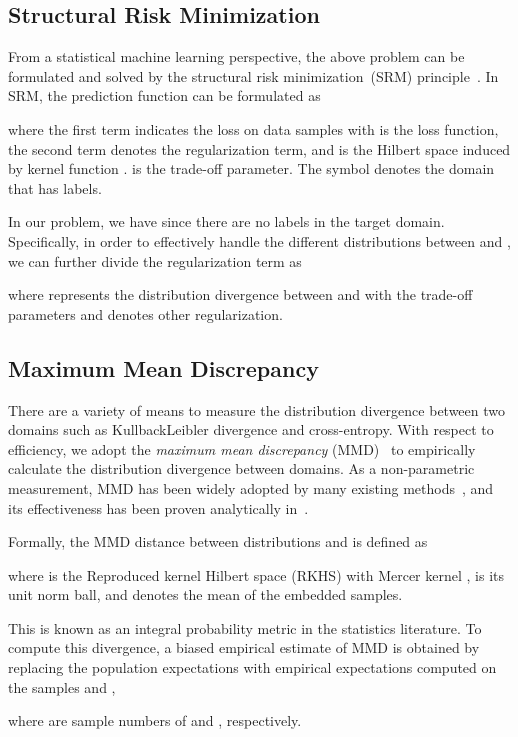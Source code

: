 \documentclass[acmsmall]{acmart}
\begin{document}
\subsection{Structural Risk Minimization}
From a statistical machine learning perspective, the above problem can be formulated and solved by the structural risk minimization~(SRM) principle~\cite{vapnik1998statistical}. In SRM, the prediction function  can be formulated as

where the first term indicates the loss on data samples with  is the loss function, the second term denotes the regularization term, and  is the Hilbert space induced by kernel function .  is the trade-off parameter. The symbol  denotes the domain that has labels. 

In our problem, we have  since there are no labels in the target domain. Specifically, in order to effectively handle the different distributions between  and , we can further divide the regularization term as

where  represents the distribution divergence between  and  with  the trade-off parameters and  denotes other regularization.

\subsection{Maximum Mean Discrepancy}
There are a variety of means to measure the distribution divergence between two domains such as KullbackLeibler divergence and cross-entropy. With respect to efficiency, we adopt the \textit{maximum mean discrepancy} (MMD)~\cite{ben2007analysis} to empirically calculate the distribution divergence between domains. As a non-parametric measurement, MMD has been widely adopted by many existing methods~\cite{zhang2017joint,ghifary2017scatter,pan2011domain}, and its effectiveness has been proven analytically in~\cite{gretton2012kernel}. 

Formally, the MMD distance between distributions  and  is defined as~\cite{gretton2012kernel}

where  is the Reproduced kernel Hilbert space (RKHS) with Mercer kernel ,  is its unit norm ball, and  denotes the mean of the embedded samples.

This is known as an integral probability metric in the statistics literature. To compute this divergence, a biased empirical estimate of MMD is obtained by replacing the population expectations with empirical expectations computed on the samples  and ,

where  are sample numbers of  and , respectively.
\end{document}
